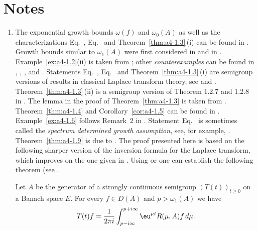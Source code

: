 \section*{Notes}
\begin{enumerate}[label=\emph{Section \arabic*:}, wide, itemsep=1ex]

\item 
The exponential growth bounds $\omega(f)$ and $\omega_{0}(A)$ as well as the characterizations Eq.~, Eq.~ and Theorem~\ref{thm:a4-1.3}\,(i) can be found in \textcite{hillephillips:1957}.
Growth bounds similar to $\omega_{1}(A)$ were first considered in \textcite{djacenko:1976} and in \textcite[Proposition~2]{zabczyk:1979}. 
Example~\ref{ex:a4-1.2}(ii) is taken from \textcite{wolff:1981}; other \emph{counterexamples} can be found in \textcite{hillephillips:1957}, \textcite{foias:1973}, \textcite{triggiani:1975a}, 
\textcite{zabczyk:1975} and \textcite{greinervoigtwolff:1981}. 
Statements Eq.~, Eq.~ and Theorem~\ref{thm:a4-1.3}\,(i) are semigroup versions of results in classical Laplace transform theory, see \textcite{hillephillips:1957} and \textcite{widder:1946}. 
Theorem~\ref{thm:a4-1.3}\,(ii) is a semigroup version of Theorem 1.2.7 and 1.2.8 in \textcite{doetsch:1950}. 
The lemma in the proof of Theorem~\ref{thm:a4-1.3} is taken from \textcite{milstein:1975}. 
Theorem~\ref{thm:a4-1.4} and Corollary~\ref{cor:a4-1.5} can be found in \textcite{neubrander:1985a}. 
Example~\ref{ex:a4-1.6} follows Remark~2 in \textcite{zabczyk:1975}. 
Statement Eq.~ is sometimes called the \emph{spectrum determined growth assumption}, see, for example, \textcite{triggiani:1975b}. 
Theorem~\ref{thm:a4-1.9} is due to \textcite{slemrod:1976}. 
The proof presented here is based on the following sharper version of the inversion formula for the Laplace transform, which improves on the one given in \textcite[p.349]{hillephillips:1957}. 
Using \textcite[p.66]{widder:1946} or \textcite[p.212]{doetsch:1950} one can establish the following theorem (see \textcite{neubrander:1984b}.

\begin{theorem}\label{thm:a4-2.6}
Let $A$ be the generator of a strongly continuous semigroup $(T(t))_{t \geq 0}$ on a Banach space $E$. 
For every $f \in D(A)$ and $p > \omega_{1}(A)$ we have
\[
T(t)f = \frac{1}{2\pi i} \int_{p-i\infty}^{p+i\infty} \eu^{\mu t}R(\mu,A)f \, d\mu.
\]
\end{theorem}
 


\end{enumerate}
